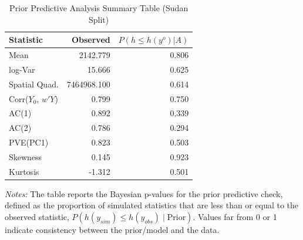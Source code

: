 \begin{table}[!h]
\centering
\caption{Prior Predictive Analysis Summary Table (Sudan Split)}
\label{tab:sudan_ppa}
\centering
\begin{tabular}[t]{lrr}
\toprule
Statistic & Observed & $P(h \leq h(y^{o}) | A)$\\
\midrule
Mean & 2142.779 & 0.806\\
log-Var & 15.666 & 0.625\\
Spatial Quad. & 7464968.100 & 0.614\\
Corr($Y_0$, $w'Y$) & 0.799 & 0.750\\
AC(1) & 0.892 & 0.339\\
\addlinespace
AC(2) & 0.786 & 0.294\\
PVE(PC1) & 0.823 & 0.503\\
Skewness & 0.145 & 0.923\\
Kurtosis & -1.312 & 0.501\\
\bottomrule
\end{tabular}
\begin{tablenotes}
  \footnotesize
  \item \textit{Notes:} The table reports the Bayesian p-values for the prior predictive check, defined as the proportion of simulated statistics that are less than or equal to the observed statistic, $P(h(y_{sim}) \le h(y_{obs}) \mid \text{Prior})$. Values far from 0 or 1 indicate consistency between the prior/model and the data.
\end{tablenotes}
\end{table}
